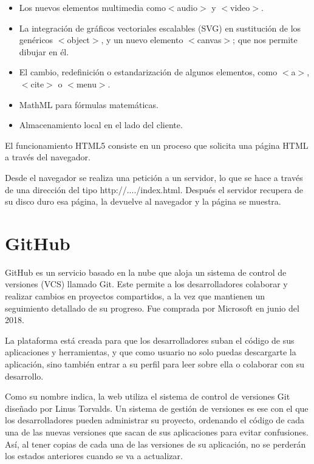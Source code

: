 \documentclass[a4paper, 12pt]{book}
\begin{document}
\begin{itemize}
    \item Los nuevos elementos multimedia como$<$audio$>$ y $<$video$>$.
    
    \item La integración de gráficos vectoriales escalables (SVG) en sustitución de los genéricos $<$object$>$, y un nuevo elemento $<$canvas$>$; que nos permite dibujar en él.

    \item El cambio, redefinición o estandarización de algunos elementos, como $<$a$>$, $<$cite$>$ o $<$menu$>$.
    
    \item MathML para fórmulas matemáticas.
    
    \item Almacenamiento local en el lado del cliente.
    \newline
\end{itemize}

El funcionamiento HTML5 consiste en un proceso que solicita una página HTML a través del navegador.

Desde el navegador se realiza una petición a un servidor, lo que se hace a través de una dirección del tipo http://..../index.html. Después el servidor recupera de su disco duro esa página, la devuelve al navegador y la página se muestra.

\newpage
\section{GitHub} 
\label{sec:Github_info}

GitHub es un servicio basado en la nube que aloja un sistema de control de versiones (VCS) llamado Git. Este permite a los desarrolladores colaborar y realizar cambios en proyectos compartidos, a la vez que mantienen un seguimiento detallado de su progreso. Fue comprada por Microsoft en junio del 2018. 

La plataforma está creada para que los desarrolladores suban el código de sus aplicaciones y herramientas, y que como usuario no solo puedas descargarte la aplicación, sino también entrar a su perfil para leer sobre ella o colaborar con su desarrollo.

Como su nombre indica, la web utiliza el sistema de control de versiones Git diseñado por Linus Torvalds. Un sistema de gestión de versiones es ese con el que los desarrolladores pueden administrar su proyecto, ordenando el código de cada una de las nuevas versiones que sacan de sus aplicaciones para evitar confusiones. Así, al tener copias de cada una de las versiones de su aplicación, no se perderán los estados anteriores cuando se va a actualizar.
\end{document}
